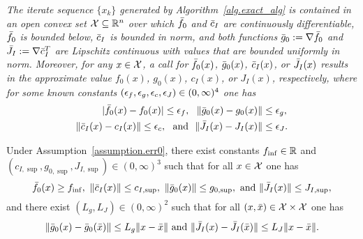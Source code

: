 \begin{assumption}\label{assumption.err0}
  \textit{
  The iterate sequence $\{x_k\}$ generated by Algorithm~\ref{alg.exact_alg} is contained in an open convex set $\mathcal{X} \subseteq \mathbb{R}^n$ over which ${\bar f}_0$ and ${\bar c}_I$ are continuously differentiable, ${\bar f}_0$ is bounded below, ${\bar c}_I$ is bounded in norm, and both functions ${\bar g}_0 := \nabla {\bar f}_0$ and ${\bar J}_I := \nabla {\bar c}_I^T$ are Lipschitz continuous with values that are bounded uniformly in norm.  Moreover, for any $x \in \mathcal{X}$, a call for ${\bar f}_0(x)$, ${\bar g}_0(x)$, ${\bar c}_I(x)$, or ${\bar J}_I(x)$ results in the approximate value $f_0(x)$, $g_0(x)$, $c_I(x)$, or $J_I(x)$, respectively, where for some known constants $(\epsilon_f,\epsilon_g,\epsilon_c,\epsilon_J) \in (0,\infty)^4$ one has
  \begin{equation}\label{eq.errors}
    \begin{aligned}
      |\ftrue_0(x) - f_0(x) | \leq \eps_f,\ \ \|\gtrue_0(x) - g_0(x) \| &\leq \eps_g, \\ \|\ctrue_I(x) - c_I(x) \| \leq \eps_c,\ \ \text{and}\ \ \|\Jtrue_I(x) - J_I(x)\| &\leq \eps_J.
    \end{aligned}
  \end{equation}
  }
\end{assumption}
Under Assumption~\ref{assumption.err0}, there exist constants $f_{\inf} \in \mathbb{R}$ and $(c_{I,\sup},g_{0,\sup},J_{I,\sup}) \in (0,\infty)^3$ such that for all $x \in \mathcal{X}$ one has
\begin{equation*}
  \ftrue_0(x) \geq f_{\inf},\ \|\ctrue_I(x)\| \leq c_{I,\sup},\ \|\gtrue_0(x)\| \leq g_{0,\sup},\ \text{and}\ \|\Jtrue_I(x)\| \leq J_{I,\sup},
\end{equation*}
and there exist $(L_g,L_J) \in (0,\infty)^2$ such that for all $(x,\bar x) \in \mathcal{X} \times \mathcal{X}$ one has
\begin{equation*}
  \|{\bar g}_0(x) - {\bar g}_0(\bar x)\| \leq L_g \|x - \bar x\|\ \text{and}\ \|{\bar J}_I(x) - {\bar J}_I(\bar x)\| \leq L_J \|x - \bar x\|.
\end{equation*}

